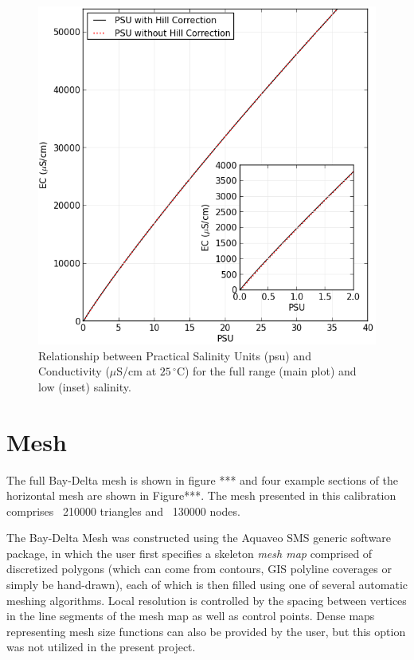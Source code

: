\begin{figure}
	\centering
		\includegraphics[scale=1]{image/ec_psu}
	\caption{Relationship between Practical Salinity Units (psu) and Conductivity 
	  ($\mu$S/cm at $25\,^{\circ}\mathrm{C}$) for the full range (main plot) and low (inset) salinity.}
	\label{fig:ec_psu}
\end{figure}

\section{Mesh}
\label{sec-delta-mesh}
The full Bay-Delta mesh is shown in figure *** and four example sections of the horizontal mesh are shown in Figure***. 
The mesh presented in this calibration comprises ~210000 triangles and ~130000 nodes. 

The Bay-Delta Mesh was constructed using the Aquaveo SMS generic software package, in which the user first specifies a 
skeleton {\em mesh map} comprised of discretized polygons (which can come from contours, 
GIS polyline coverages or simply be hand-drawn), each of which is then filled using 
one of several automatic meshing algorithms. Local resolution is controlled by
the spacing between vertices in the line segments of the mesh map as well as control points. Dense maps representing 
mesh size functions can also be provided by the user, but this option was not utilized in the present project.

